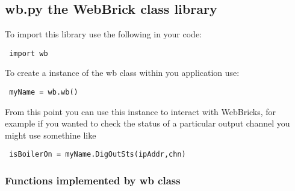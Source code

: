 \subsection{wb.py the WebBrick class library}

To import this library use the following in your code:

\begin{verbatim} import wb \end{verbatim}

To create a instance of the wb class within you application use:

\begin{verbatim} myName = wb.wb() \end{verbatim}

From this point you can use this instance to interact with WebBricks, for example
if you wanted to check the status of a particular output channel you might use
somethine like

\begin{verbatim} isBoilerOn = myName.DigOutSts(ipAddr,chn) \end{verbatim}

\subsubsection{Functions implemented by wb class}


